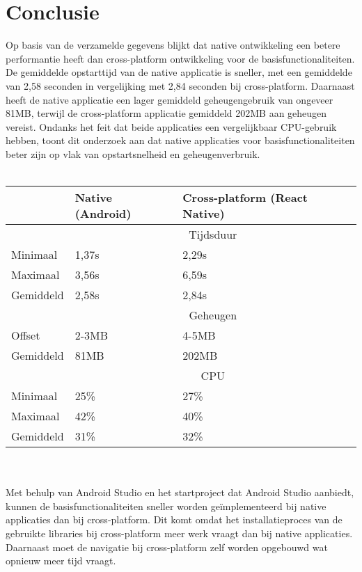 \section{Conclusie}
Op basis van de verzamelde gegevens blijkt dat native ontwikkeling een betere
performantie heeft dan cross-platform ontwikkeling voor de basisfunctionaliteiten. De gemiddelde 
opstarttijd van de native applicatie is sneller, met een gemiddelde van 2,58 seconden 
in vergelijking met 2,84 seconden bij cross-platform. Daarnaast heeft de native 
applicatie een lager gemiddeld geheugengebruik van ongeveer 81MB, terwijl de cross-platform 
applicatie gemiddeld 202MB aan geheugen vereist. Ondanks het feit dat beide applicaties een
vergelijkbaar CPU-gebruik hebben, toont dit onderzoek aan dat native applicaties voor
basisfunctionaliteiten beter zijn op vlak van opstartsnelheid en geheugenverbruik.
\\\\
\begin{tabular}{ |p{3cm}||p{5cm}|p{5cm}| }
    \hline
     & Native (Android) & Cross-platform (React Native) \\
    \hline
     & \multicolumn{2}{|c|}{Tijdsduur} \\
    \hline
    Minimaal & 1,37s & 2,29s \\
    Maximaal & 3,56s & 6,59s \\
    Gemiddeld & 2,58s & 2,84s \\
    \hline
     & \multicolumn{2}{|c|}{Geheugen} \\ 
    \hline
    Offset & 2-3MB & 4-5MB \\
    Gemiddeld & 81MB & 202MB \\
    \hline
     & \multicolumn{2}{|c|}{CPU} \\
    \hline
    Minimaal & 25\% & 27\% \\
    Maximaal & 42\% & 40\% \\
    Gemiddeld & 31\% & 32\% \\
    \hline
\end{tabular}
\\\\
Met behulp van Android Studio en het startproject dat Android Studio aanbiedt, 
kunnen de basisfunctionaliteiten sneller worden geïmplementeerd bij 
native applicaties dan bij cross-platform. Dit komt omdat het installatieproces van 
de gebruikte libraries bij cross-platform meer werk vraagt dan bij native applicaties. 
Daarnaast moet de navigatie bij cross-platform zelf worden opgebouwd wat opnieuw meer tijd vraagt.
